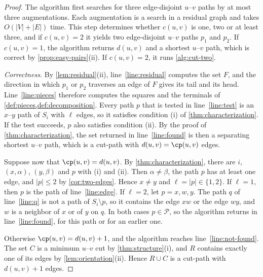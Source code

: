 \begin{proof}
The algorithm first searches for three edge-disjoint $u$--$v$ paths by at most three augmentations.
Each augmentation is a search in a residual graph and takes $O(|V| + |E|)$ time.
This step determines whether $c(u, v)$ is one, two or at least three, and if $c(u, v) = 2$ it yields two edge-disjoint $u$--$v$ paths $p_1$ and $p_2$.
If $c(u, v) = 1$, the algorithm returns $d(u, v)$ and a shortest $u$--$v$ path, which is correct by \cref{prop:easy-pairs}(ii).
If $c(u, v) = 2$, it runs \cref{alg:cut-two}.

\emph{Correctness.}
By \cref{lem:residual}(ii), line~\ref{line:residual} computes the set $F$, and the direction in which $p_1$ or $p_2$ traverses an edge of $F$ gives its tail and its head.
Line~\ref{line:pieces} therefore computes the squares and the terminals of \cref{def:pieces,def:decomposition}.
Every path $p$ that is tested in line~\ref{line:test} is an $x$--$y$ path of $S_i$ with $\ell$ edges, so it satisfies condition (i) of \cref{thm:characterization}.
If the test succeeds, $p$ also satisfies condition (ii).
By the proof of \cref{thm:characterization}, the set returned in line~\ref{line:found} is then a separating shortest $u$--$v$ path, which is a cut-path with $d(u, v) = \cp(u, v)$ edges.

Suppose now that $\cp(u, v) = d(u, v)$.
By \cref{thm:characterization}, there are $i$, $(x, \alpha)$, $(y, \beta)$ and $p$ with (i) and (ii).
Then $\alpha \neq \beta$, the path $p$ has at least one edge, and $|p| \leq 2$ by \cref{cor:two-edges}.
Hence $x \neq y$ and $\ell = |p| \in \{1, 2\}$.
If $\ell = 1$, then $p$ is the path of line~\ref{line:edge}.
If $\ell = 2$, let $p = x, w, y$.
The path $q$ of line~\ref{line:q} is not a path of $S_i \setminus p$, so it contains the edge $xw$ or the edge $wy$, and $w$ is a neighbor of $x$ or of $y$ on $q$.
In both cases $p \in \mathcal{P}$, so the algorithm returns in line~\ref{line:found}, for this path or for an earlier one.

Otherwise $\cp(u, v) = d(u, v) + 1$, and the algorithm reaches line~\ref{line:not-found}.
The set $C$ is a minimum $u$--$v$ cut by \cref{thm:structure}(i), and $R$ contains exactly one of its edges by \cref{lem:orientation}(ii).
Hence $R \cup C$ is a cut-path with $d(u, v) + 1$ edges.


\end{proof}
